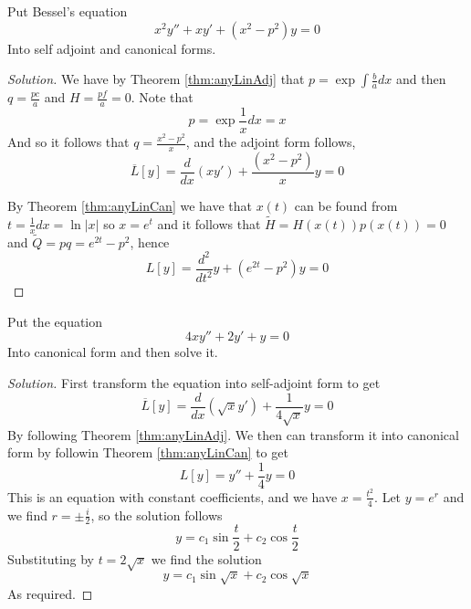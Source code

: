\begin{example}
  Put Bessel's equation
  \[x^2y''+xy'+(x^2-p^2)y=0\]
  Into self adjoint and canonical forms.
\end{example}
\begin{proof}[Solution]
  We have by Theorem \ref{thm:anyLinAdj} that $p=\exp\int\frac{b}{a}dx$ and then
  $q=\frac{pc}{a}$ and $H=\frac{pf}{a}=0$. Note that 
  \[p=\exp\frac{1}{x}dx = x\]
  And so it follows that $q=\frac{x^2-p^2}{x}$, and the adjoint form follows,
  \[\overline{L}[y]=\frac{d}{dx}(xy')+ \frac{(x^2-p^2)}{x}y=0\]

  By Theorem \ref{thm:anyLinCan} we have that $x(t)$ can be found from
  $t=\frac{1}{x}dx=\ln|x|$ so $x=e^t$ and it follows that $\tilde{H}=H(x(t))p(x(t))=0$ and
  $\tilde{Q}=pq= e^{2t}-p^2$, hence
  \[L[y]=\frac{d^2}{dt^2}y + (e^{2t}-p^2)y=0\]
\end{proof}

\begin{example}
  Put  the equation
  \[4xy''+2y'+y=0\]
  Into canonical form and then solve it.
\end{example}
\begin{proof}[Solution]
  First transform the equation into self-adjoint form to get 
  \[\overline{L}[y]= \frac{d}{dx}(\sqrt{x}y')+ \frac{1}{4\sqrt{x}}y=0\]
  By following Theorem \ref{thm:anyLinAdj}. We then can transform it into canonical form
  by followin Theorem \ref{thm:anyLinCan} to get
  \[L[y]=y''+\frac{1}{4}y=0\]
  This is an equation with constant coefficients, and we have $x=\frac{t^2}{4}$. Let
  $y=e^r$ and we find $r=\pm \frac{i}{2}$, so the solution follows
  \[y=c_1\sin\frac{t}{2} + c_2\cos\frac{t}{2}\]
  Substituting by $t=2\sqrt{x}$ we find the solution 
  \[y=c_1\sin\sqrt{x} + c_2\cos\sqrt{x}\]
  As required.

\end{proof}



